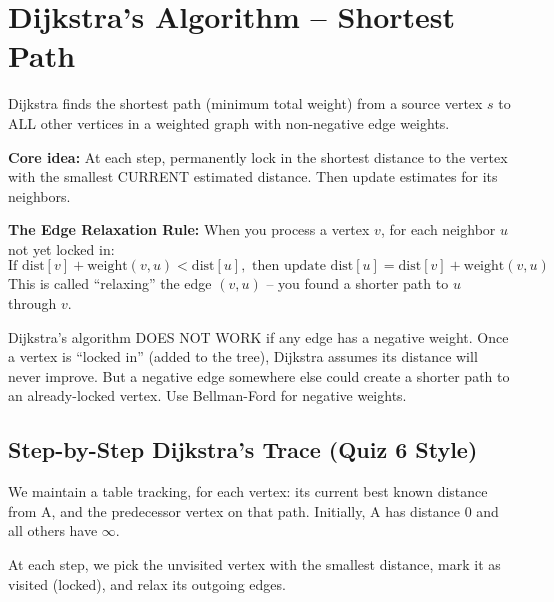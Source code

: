 \documentclass[12pt,portrait]{article}
\begin{document}
\section{Dijkstra's Algorithm -- Shortest Path}
\label{sec:dijkstra}

\begin{rulebox}
Dijkstra finds the shortest path (minimum total weight) from a source vertex $s$ to ALL other vertices in a weighted graph with non-negative edge weights.

\textbf{Core idea:} At each step, permanently lock in the shortest distance to the vertex with the smallest CURRENT estimated distance. Then update estimates for its neighbors.

\textbf{The Edge Relaxation Rule:} When you process a vertex $v$, for each neighbor $u$ not yet locked in:
$$\text{If } \text{dist}[v] + \text{weight}(v,u) < \text{dist}[u], \text{ then update } \text{dist}[u] = \text{dist}[v] + \text{weight}(v,u)$$
This is called ``relaxing'' the edge $(v,u)$ -- you found a shorter path to $u$ through $v$.
\end{rulebox}

\begin{warningbox}
Dijkstra's algorithm DOES NOT WORK if any edge has a negative weight. Once a vertex is ``locked in'' (added to the tree), Dijkstra assumes its distance will never improve. But a negative edge somewhere else could create a shorter path to an already-locked vertex. Use Bellman-Ford for negative weights.
\end{warningbox}

\subsection{Step-by-Step Dijkstra's Trace (Quiz 6 Style)}

\begin{rulebox}
We maintain a table tracking, for each vertex: its current best known distance from A, and the predecessor vertex on that path. Initially, A has distance 0 and all others have $\infty$.

At each step, we pick the unvisited vertex with the smallest distance, mark it as visited (locked), and relax its outgoing edges.
\end{rulebox}
\end{document}
